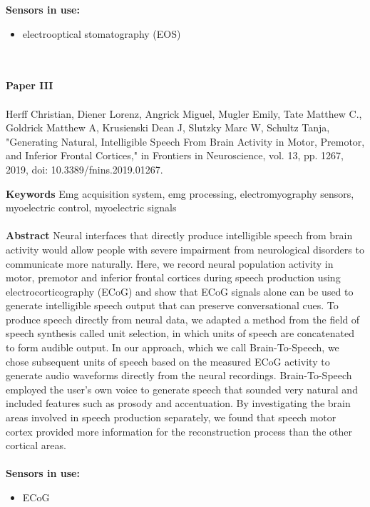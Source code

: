 \noindent
\textbf{Sensors in use:}
\begin{itemize}
    \item electrooptical stomatography (EOS)\\ \\
\end{itemize}

\\ 
\textbf{Paper III} 
\\ \\
\noindent
Herff Christian, Diener Lorenz, Angrick Miguel, Mugler Emily, Tate Matthew C., Goldrick Matthew A, Krusienski Dean J, Slutzky Marc W, Schultz Tanja, "Generating Natural, Intelligible Speech From Brain Activity in Motor, Premotor, and Inferior Frontal Cortices," in Frontiers in Neuroscience, vol. 13, pp. 1267, 2019, doi: 10.3389/fnins.2019.01267.

\noindent
\textbf{Keywords} Emg acquisition system, emg processing, electromyography sensors, myoelectric control, myoelectric signals\\ \\

\noindent
\textbf{Abstract} Neural interfaces that directly produce intelligible speech from brain activity would allow people with severe impairment from neurological disorders to communicate more naturally. Here, we record neural population activity in motor, premotor and inferior frontal cortices during speech production using electrocorticography (ECoG) and show that ECoG signals alone can be used to generate intelligible speech output that can preserve conversational cues. To produce speech directly from neural data, we adapted a method from the field of speech synthesis called unit selection, in which units of speech are concatenated to form audible output. In our approach, which we call Brain-To-Speech, we chose subsequent units of speech based on the measured ECoG activity to generate audio waveforms directly from the neural recordings. Brain-To-Speech employed the user's own voice to generate speech that sounded very natural and included features such as prosody and accentuation. By investigating the brain areas involved in speech production separately, we found that speech motor cortex provided more information for the reconstruction process than the other cortical areas.
\\ \\

\noindent
\textbf{Sensors in use:}
\begin{itemize}
    \item ECoG \\ \\
\end{itemize}




